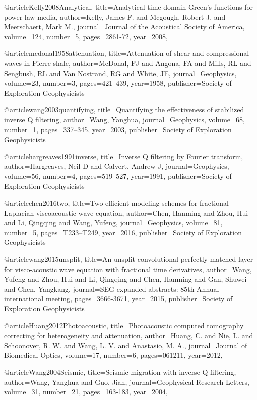 @article{Kelly2008Analytical,
  title={Analytical time-domain Green's functions for power-law media},
  author={Kelly, James F. and Mcgough, Robert J. and Meerschaert, Mark M.},
  journal={Journal of the Acoustical Society of America},
  volume={124},
  number={5},
  pages={2861-72},
  year={2008},
}

@article{mcdonal1958attenuation,
  title={Attenuation of shear and compressional waves in Pierre shale},
  author={McDonal, FJ and Angona, FA and Mills, RL and Sengbush, RL and Van Nostrand, RG and White, JE},
  journal={Geophysics},
  volume={23},
  number={3},
  pages={421--439},
  year={1958},
  publisher={Society of Exploration Geophysicists}
}

@article{wang2003quantifying,
  title={Quantifying the effectiveness of stabilized inverse {Q} filtering},
  author={Wang, Yanghua},
  journal={Geophysics},
  volume={68},
  number={1},
  pages={337--345},
  year={2003},
  publisher={Society of Exploration Geophysicists}
}

@article{hargreaves1991inverse,
  title={Inverse {Q} filtering by {F}ourier transform},
  author={Hargreaves, Neil D and Calvert, Andrew J},
  journal={Geophysics},
  volume={56},
  number={4},
  pages={519--527},
  year={1991},
  publisher={Society of Exploration Geophysicists}
}

@article{chen2016two,
  title={Two efficient modeling schemes for fractional {L}aplacian viscoacoustic wave equation},
  author={Chen, Hanming and Zhou, Hui and Li, Qingqing and Wang, Yufeng},
  journal={Geophysics},
  volume={81},
  number={5},
  pages={T233--T249},
  year={2016},
  publisher={Society of Exploration Geophysicists}
}

@article{wang2015unsplit,
  title={An unsplit convolutional perfectly matched layer for visco-acoustic wave equation with fractional time derivatives},
  author={Wang, Yufeng and Zhou, Hui and Li, Qingqing and Chen, Hanming and Gan, Shuwei and Chen, Yangkang},
  journal={SEG expanded abstracts: 85th Annual international meeting},
  pages={3666-3671},
  year={2015},
  publisher={Society of Exploration Geophysicists}
}

@article{Huang2012Photoacoustic,
  title={Photoacoustic computed tomography correcting for heterogeneity and attenuation},
  author={Huang, C. and Nie, L. and Schoonover, R. W. and Wang, L. V. and Anastasio, M. A.},
  journal={Journal of Biomedical Optics},
  volume={17},
  number={6},
  pages={061211},
  year={2012},
}

@article{Wang2004Seismic,
  title={Seismic migration with inverse {Q} filtering},
  author={Wang, Yanghua and Guo, Jian},
  journal={Geophysical Research Letters},
  volume={31},
  number={21},
  pages={163-183},
  year={2004},
}

